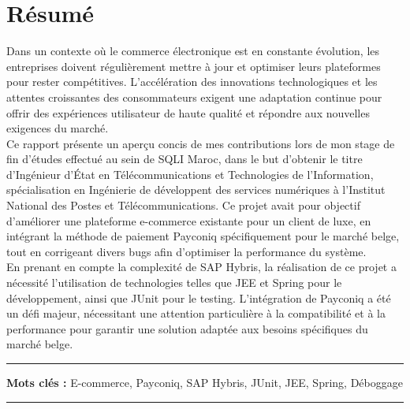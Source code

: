 

\chapter*{Résumé}

Dans un contexte où le commerce électronique est en constante évolution, les entreprises doivent régulièrement mettre à jour et optimiser leurs plateformes pour rester compétitives. L'accélération des innovations technologiques et les attentes croissantes des consommateurs exigent une adaptation continue pour offrir des expériences utilisateur de haute qualité et répondre aux nouvelles exigences du marché. \\


Ce rapport présente un aperçu concis de mes contributions lors de mon stage de fin d'études effectué au sein de SQLI Maroc, dans le but d'obtenir le titre d'Ingénieur d'État en Télécommunications et Technologies de l'Information, spécialisation en Ingénierie de développent des services numériques à l'Institut National des Postes et Télécommunications. Ce projet avait pour objectif d'améliorer une plateforme e-commerce existante pour un client de luxe, en intégrant la méthode de paiement Payconiq spécifiquement pour le marché belge, tout en corrigeant divers bugs afin d'optimiser la performance du système.\\

En prenant en compte la complexité de SAP Hybris, la réalisation de ce projet a nécessité l'utilisation de technologies telles que JEE et Spring pour le développement, ainsi que JUnit pour le testing. L'intégration de Payconiq a été un défi majeur, nécessitant une attention particulière à la compatibilité et à la performance pour garantir une solution adaptée aux besoins spécifiques du marché belge.

\noindent\rule[2pt]{\textwidth}{0.5pt}

{\textbf{Mots clés :}}
E-commerce, Payconiq, SAP Hybris, JUnit, JEE, Spring, Déboggage
\\
\noindent\rule[2pt]{\textwidth}{0.5pt}